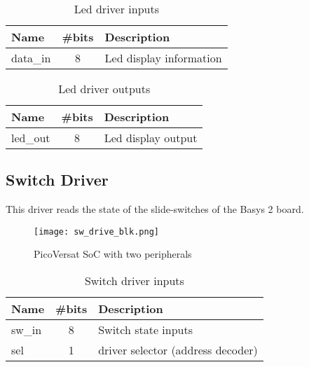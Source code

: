\begin{table}[!htbp]
    \centering
    \caption{Led driver inputs}
    \label{tab:ledIn}
    \begin{tabular}{@{}lll@{}}
    \toprule
    Name     & \#bits                & Description             \\ \midrule
    data\_in & \multicolumn{1}{c}{8} & Led display information \\ \bottomrule
    \end{tabular}
    \end{table}

\begin{table}[!htbp]
    \centering
    \caption{Led driver outputs}
    \label{tab:ledOut}
    \begin{tabular}{@{}lll@{}}
    \toprule
    Name     & \#bits                & Description        \\ \midrule
    led\_out & \multicolumn{1}{c}{8} & Led display output \\ \bottomrule
    \end{tabular}
    \end{table}



\subsection{Switch Driver}

This driver reads the state of the slide-switches of the Basys 2 board.

\begin{figure}[!ht]
    \centerline{\texttt{[image: sw\_drive\_blk.png]}}
    \vspace{0cm}\caption{PicoVersat SoC with two peripherals}
    \label{fig:periphs}
\end{figure}

\begin{table}[ht]
    \centering
    \caption{Switch driver inputs}
    \label{tab:swIn}
    \begin{tabular}{@{}lcl@{}}
    \toprule
    Name   & \multicolumn{1}{l}{\#bits} & Description                       \\ \midrule
    sw\_in & 8                          & Switch state inputs               \\
    sel    & 1                          & driver selector (address decoder) \\ \bottomrule
    \end{tabular}
    \end{table}

